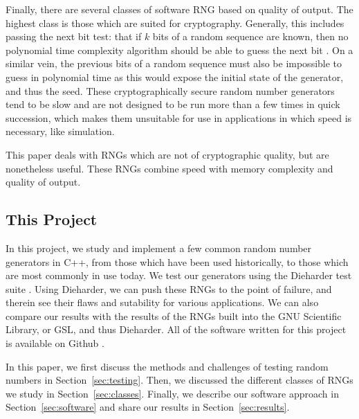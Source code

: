 Finally, there are several classes of software RNG based on quality of output. The highest class is those which are suited for cryptography. Generally, this includes passing the next bit test: that if $k$ bits of a random sequence are known, then no polynomial time complexity algorithm should be able to guess the next bit \cite{Yao_1982}. On a similar vein, the previous bits of a random sequence must also be impossible to guess in polynomial time as this would expose the initial state of the generator, and thus the seed. These cryptographically secure random number generators tend to be slow and are not designed to be run more than a few times in quick succession, which makes them unsuitable for use in applications in which speed is necessary, like simulation.

This paper deals with RNGs which are not of cryptographic quality, but are nonetheless useful. These RNGs combine speed with memory complexity and quality of output.

\subsection{This Project}
In this project, we study and implement a few common random number generators in C++, from those which have been used historically, to those which are most commonly in use today. We test our generators using the Dieharder test suite \cite{dieharder_website}. Using Dieharder, we can push these RNGs to the point of failure, and therein see their flaws and sutability for various applications. We can also compare our results with the results of the RNGs built into the GNU Scientific Library, or GSL, and thus Dieharder. All of the software written for this project is available on Github \cite{github_repo}.

In this paper, we first discuss the methods and challenges of testing random numbers in Section~\ref{sec:testing}. Then, we discussed the different classes of RNGs we study in Section~\ref{sec:classes}. Finally, we describe our software approach in Section~\ref{sec:software} and share our results in Section~\ref{sec:results}.
